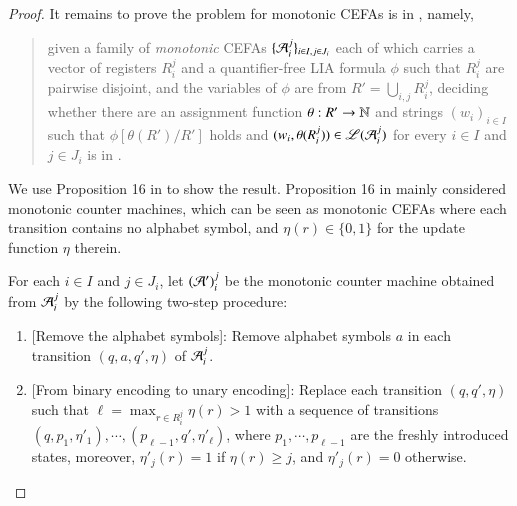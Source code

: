 \begin{proof}
	\smallskip
	
	It remains to prove the {\lasat} problem for monotonic CEFAs is in {\pspace}, namely,
	\begin{quote}
		given a family of \emph{monotonic} CEFAs $\{ \mathcal{A}_i^{j} \}_{i\in I,j\in J_i}$ each of which carries a vector of registers $R_i^j$ and a quantifier-free LIA formula $\phi$ such that  $ R_i^{j} $ are pairwise disjoint,  and the variables of $\phi$ are from $R'=\bigcup_{i,j} R_i^j$, deciding whether  there are an assignment function $\theta: R' \rightarrow \mathbb{N}$ and strings $(w_i)_{i \in I}$ such that  $\phi[\theta(R' )/R']$ holds and $(w_i, \theta(R_i^j)) \in \mathscr{L}(\mathcal{A}_{i}^j)$ for every $i \in I$ and $j \in J_i$ is in {\pspace}.
	\end{quote}
	
	
	We use Proposition 16 in \cite{LB16} to show the result. Proposition 16 in \cite{LB16} mainly considered monotonic counter machines, which can be seen as monotonic CEFAs where each transition contains no alphabet symbol, and $\eta(r) \in \{0,1\}$ for the update function $\eta$ therein.
	
	For each $i\in I$ and $j\in J_i$, let $(\mathcal{A}')_i^j$ be the monotonic counter machine obtained from $\mathcal{A}_i^{j}$ by the following two-step procedure:
	\begin{enumerate}
		\item {[Remove the alphabet symbols]}: Remove alphabet symbols $a$ in each transition $(q, a, q', \eta)$ of $\mathcal{A}_i^{j}$.
		\item {[From binary encoding to unary encoding]}: Replace each transition $(q, q', \eta)$ such that $\ell = \max_{r \in R_i^j} \eta(r) > 1$ with a sequence of transitions $(q, p_1,\eta'_1), \cdots, (p_{\ell-1}, q', \eta'_\ell)$, where $p_1, \cdots,p_{\ell-1}$ are the freshly introduced states, moreover, $\eta'_j(r) = 1$ if $\eta(r) \ge j$, and $\eta'_j(r)=0$ otherwise. 
	\end{enumerate}
	

\end{proof}
